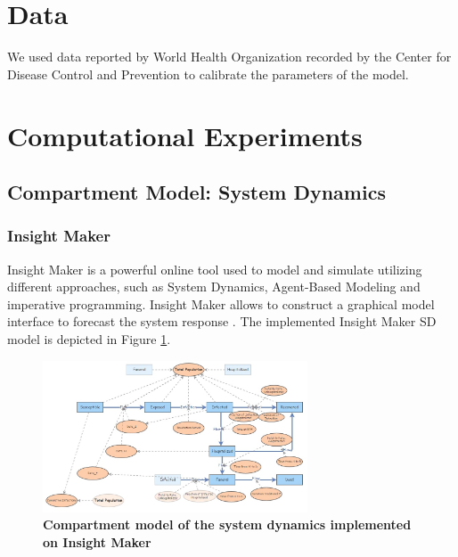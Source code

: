 \documentclass[10pt]{article}
\begin{document}
%
%
%
%
%
%
%
%
%
\section{Data}\label{sec:Data}
We used data reported by World Health Organization recorded by the Center for Disease Control and Prevention \cite{CDCData} to calibrate the parameters of the model. 

\section{Computational Experiments}

\subsection{Compartment Model: System Dynamics}
\subsubsection{Insight Maker}
 Insight Maker is a powerful online tool used to model and simulate utilizing different approaches, such as System Dynamics, Agent-Based Modeling and imperative programming. Insight Maker allows to construct a graphical model interface to forecast the system response \cite{FortmannRoe}. The implemented Insight Maker SD model is depicted in Figure \ref{fig:SD_IM}.

\begin{figure}[!h]
  \centering
  \includegraphics[width=0.7\textwidth]{SD_IM}
  \caption{ \bf Compartment model of the system dynamics implemented on Insight Maker}
\label{fig:SD_IM} 
\end{figure}
\end{document}
